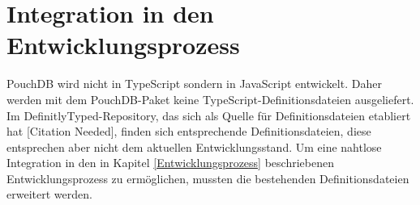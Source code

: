 \section{Integration in den Entwicklungsprozess}

PouchDB wird nicht in TypeScript sondern in JavaScript entwickelt. Daher werden mit dem PouchDB-Paket keine TypeScript-Definitionsdateien ausgeliefert. Im DefinitlyTyped-Repository, das sich als Quelle für Definitionsdateien etabliert hat [Citation Needed], finden sich entsprechende Definitionsdateien, diese entsprechen aber nicht dem aktuellen Entwicklungsstand. Um eine nahtlose Integration in den in Kapitel \ref{Entwicklungsprozess} beschriebenen Entwicklungsprozess zu ermöglichen, mussten die bestehenden Definitionsdateien erweitert werden. 
